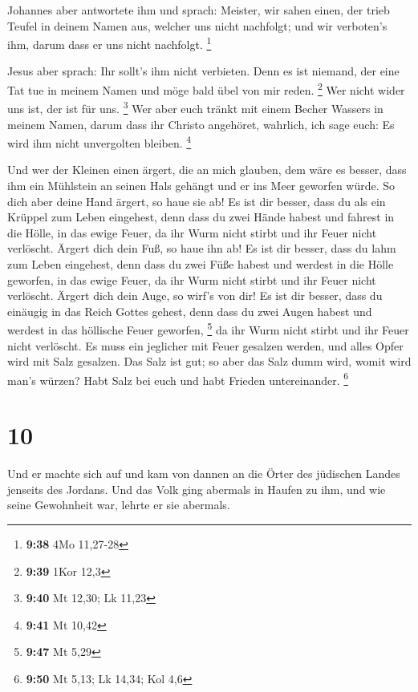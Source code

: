  Johannes aber antwortete ihm und sprach: Meister, wir
sahen einen, der trieb Teufel in deinem Namen aus, welcher uns nicht
nachfolgt; und wir verboten's ihm, darum dass er uns nicht nachfolgt.
\footnote{\textbf{9:38} 4Mo 11,27-28}

 Jesus aber sprach: Ihr sollt's ihm nicht verbieten. Denn
es ist niemand, der eine Tat tue in meinem Namen und möge bald übel von
mir reden. \footnote{\textbf{9:39} 1Kor 12,3}  Wer nicht
wider uns ist, der ist für uns. \footnote{\textbf{9:40} Mt 12,30; Lk
  11,23}  Wer aber euch tränkt mit einem Becher Wassers
in meinem Namen, darum dass ihr Christo angehöret, wahrlich, ich sage
euch: Es wird ihm nicht unvergolten bleiben. \footnote{\textbf{9:41} Mt
  10,42}

 Und wer der Kleinen einen ärgert, die an mich glauben,
dem wäre es besser, dass ihm ein Mühlstein an seinen Hals gehängt und er
ins Meer geworfen würde.  So dich aber deine Hand ärgert,
so haue sie ab! Es ist dir besser, dass du als ein Krüppel zum Leben
eingehest, denn dass du zwei Hände habest und fahrest in die Hölle, in
das ewige Feuer,  da ihr Wurm nicht stirbt und ihr Feuer
nicht verlöscht.  Ärgert dich dein Fuß, so haue ihn ab!
Es ist dir besser, dass du lahm zum Leben eingehest, denn dass du zwei
Füße habest und werdest in die Hölle geworfen, in das ewige Feuer,
 da ihr Wurm nicht stirbt und ihr Feuer nicht verlöscht.
 Ärgert dich dein Auge, so wirf's von dir! Es ist dir
besser, dass du einäugig in das Reich Gottes gehest, denn dass du zwei
Augen habest und werdest in das höllische Feuer geworfen, \footnote{\textbf{9:47}
  Mt 5,29}  da ihr Wurm nicht stirbt und ihr Feuer nicht
verlöscht.  Es muss ein jeglicher mit Feuer gesalzen
werden, und alles Opfer wird mit Salz gesalzen.  Das Salz
ist gut; so aber das Salz dumm wird, womit wird man's würzen? Habt Salz
bei euch und habt Frieden untereinander. \footnote{\textbf{9:50} Mt
  5,13; Lk 14,34; Kol 4,6}

\hypertarget{section-2}{%
\section{10}\label{section-2}}

 Und er machte sich auf und kam von dannen an die Örter
des jüdischen Landes jenseits des Jordans. Und das Volk ging abermals in
Haufen zu ihm, und wie seine Gewohnheit war, lehrte er sie abermals.

